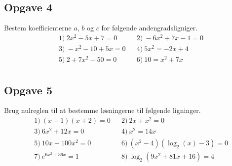 \subsection*{Opgave 4}
Bestem koefficienterne $a$, $b$ og $c$ for følgende andengradsligniger. 
\begin{align*}
	&1) \ 2x^2 - 5x + 7 = 0 & &2) \ -6x^2 +7x -1 = 0\\
	&3) \ -x^2 - 10 + 5x = 0 & &4) \ 5x^2 = -2x + 4\\
	&5) \ 2 + 7x^2 - 50 = 0 & &6) \ 10 = x^2 + 7x\\
\end{align*}
\subsection*{Opgave 5}
Brug nulreglen til at bestemme løsningerne til følgende ligninger. 
\begin{align*}
	&1) \ (x-1)(x+2) = 0 & &2) \ 2x + x^2 = 0\\
	&3) \ 6x^2 + 12x = 0 & &4) \ x^2 = 14x\\
	&5) \ 10x + 100x^2 = 0 & & 6) \ (x^2 - 4)(\log_2(x) - 3) = 0\\
	&7) \ e^{6x^2 + 36x} = 1 & &8) \ \log_2(9x^2 + 81x + 16) = 4\\
\end{align*}